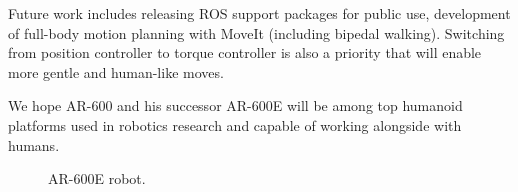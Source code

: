 \documentclass[letterpaper, 10 pt, conference]{ieeeconf}  %
\begin{document}
Future work includes releasing ROS support packages for public use, development
of full-body motion planning with MoveIt (including bipedal walking). Switching
from position controller to torque controller is also a priority that
will enable more gentle and human-like moves. 

We hope AR-600 and his successor AR-600E will be among top humanoid platforms
used in robotics research and capable of working alongside with humans.

\begin{figure} [thpb]
      \centering
      \caption{AR-600E robot.}
      \label{img:ar600e}
\end{figure}

\addtolength{\textheight}{-12cm}   %
\end{document}
